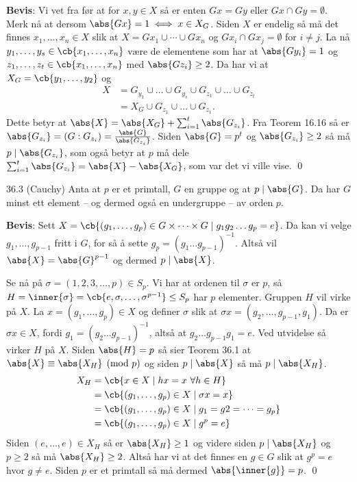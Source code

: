 \textbf{Bevis}: Vi vet fra før at for $x, y\in X$ så er enten $Gx=Gy$ eller $Gx\cap Gy=\emptyset$.
Merk nå at dersom $\abs{Gx} = 1\iff x\in X_G$. Siden $X$ er endelig så må det finnes 
$x_1, \dots, x_n\in X$ slik at $X = Gx_1\cup \cdots \cup Gx_n$ og $Gx_i \cap Gx_j = \emptyset$ for
$i\neq j$. La nå $y_1, \dots, y_s \in \cb{x_1, \dots, x_n}$ være de elementene som har at
$\abs{Gy_i} = 1$ og $z_1, \dots, z_t\in \cb{x_1, \dots, x_n}$ med $\abs{Gz_i} \geq 2$. Da har vi
at $X_G = \cb{y_1, \dots, y_2}$ og 
\begin{align}
  X &= G_{y_1}\cup \dots \cup G_{y_s}\cup G_{z_1}\cup\dots\cup G_{z_t} \\
    &= X_G\cup G_{z_1}\cup\dots\cup G_{z_1}.
\end{align}
Dette betyr at $\abs{X}=\abs{X_G} + \sum_{i=1}^t \abs{G_{z_i}}$. Fra Teorem 16.16 så er 
$\abs{G_{z_i}}=(G:G_{z_i})=\frac{\abs{G}}{\abs{G_{z_i}}}$. Siden $\abs{G} = p^t$ og 
$\abs{G_{z_i}}\geq 2$ så må $p \mid \abs{G_{z_i}}$, som også betyr at $p$ må dele
$\sum_{i=1}^t \abs{G_{z_i}} = \abs{X}-\abs{X_G}$, som var det vi ville vise. \qed


\begin{theorem*}{36.3 (Cauchy)}{}
  Anta at $p$ er et primtall, $G$ en gruppe og at $p\mid \abs{G}$. Da har $G$ minst ett element
  – og dermed også en undergruppe – av orden $p$. 
\end{theorem*}

\textbf{Bevis}: Sett $X=\cb{(g_1,\dots,g_p)\in G\times\dots\times G\mid g_1g_2\dots g_p=e}$. Da kan
vi velge $g_1, \dots, g_{p-1}$ fritt i $G$, for så å sette $g_p=(g_1\dots g_{p-1})^{-1}$. Altså
vil $\abs{X}=\abs{G}^{p-1}$ og dermed $p\mid \abs{X}$. 

Se nå på $\sigma=(1, 2, 3, \dots, p)\in S_p$. Vi har at ordenen til $\sigma$ er $p$, så 
$H = \inner{\sigma}=\cb{e,\sigma,\dots,\sigma^{p-1}}\leq S_p$ har $p$ elementer. Gruppen $H$ vil
virke på $X$. La $x=(g_1,\dots,g_p)\in X$ og definer $\sigma$ slik at 
$\sigma x = (g_2, \dots, g_{p-1}, g_1)$. Da er $\sigma x \in X$, fordi 
$g_1 = (g_2\dots g_{p-1})^{-1}$, altså at $g_2\dots g_{p-1}g_1=e$. Ved utvidelse så virker $H$ på
$X$. Siden $\abs{H}=p$ så sier Teorem 36.1 at $\abs{X}\equiv \abs{X_H} \pmod{p}$ og siden 
$p\mid \abs{X}$ så må $p\mid \abs{X_H}$.
\begin{align}
  X_H &= \cb{x\in X\mid hx = x\ \forall h\in H} \\
      &= \cb{(g_1,\dots,g_p)\in X\mid \sigma x = x} \\
      &= \cb{(g_1,\dots,g_p)\in X\mid g_1=g2=\cdots=g_p}\\
      &= \cb{(g_1,\dots,g_p)\in X\mid g^p = e}\\
\end{align}
Siden $(e,\dots,e)\in X_H$ så er $\abs{X_H}\geq 1$ og videre siden $p\mid \abs{X_H}$ og $p\geq 2$
så må $\abs{X_H}\geq 2$. Altså har vi at det finnes en $g\in G$ slik at $g^p = e$ hvor $g\neq e$. 
Siden $p$ er et primtall så må dermed $\abs{\inner{g}}=p$. \qed

